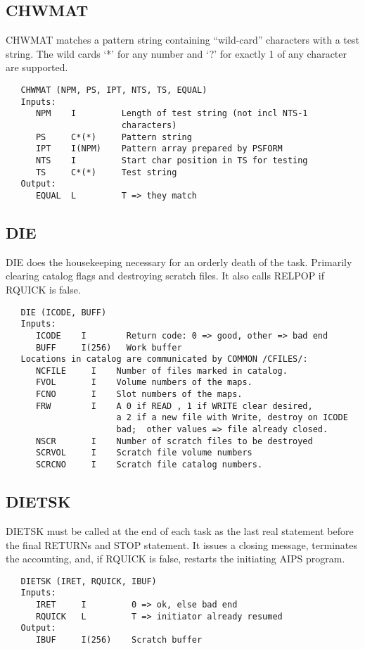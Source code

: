 \subsection{CHWMAT}
CHWMAT matches a pattern string containing ``wild-card'' characters
with a test string.  The wild cards `*' for any number and `?' for
exactly 1 of any character are supported.
\begin{verbatim}
   CHWMAT (NPM, PS, IPT, NTS, TS, EQUAL)
   Inputs:
      NPM    I         Length of test string (not incl NTS-1
                       characters)
      PS     C*(*)     Pattern string
      IPT    I(NPM)    Pattern array prepared by PSFORM
      NTS    I         Start char position in TS for testing
      TS     C*(*)     Test string
   Output:
      EQUAL  L         T => they match
\end{verbatim}

\subsection{DIE}
DIE does the housekeeping necessary for an orderly death of the
task.  Primarily clearing catalog flags and destroying scratch
files.  It also calls RELPOP if RQUICK is false.
\begin{verbatim}
   DIE (ICODE, BUFF)
   Inputs:
      ICODE    I        Return code: 0 => good, other => bad end
      BUFF     I(256)   Work buffer
   Locations in catalog are communicated by COMMON /CFILES/:
      NCFILE     I    Number of files marked in catalog.
      FVOL       I    Volume numbers of the maps.
      FCNO       I    Slot numbers of the maps.
      FRW        I    A 0 if READ , 1 if WRITE clear desired,
                      a 2 if a new file with Write, destroy on ICODE
                      bad;  other values => file already closed.
      NSCR       I    Number of scratch files to be destroyed
      SCRVOL     I    Scratch file volume numbers
      SCRCNO     I    Scratch file catalog numbers.
\end{verbatim}

\subsection{DIETSK}
DIETSK must be called at the end of each task as the last real
statement before the final RETURNs and STOP statement.  It issues a
closing message, terminates the accounting, and, if RQUICK is false,
restarts the initiating AIPS program.
\begin{verbatim}
   DIETSK (IRET, RQUICK, IBUF)
   Inputs:
      IRET     I         0 => ok, else bad end
      RQUICK   L         T => initiator already resumed
   Output:
      IBUF     I(256)    Scratch buffer
\end{verbatim}

